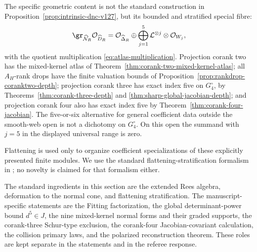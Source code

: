 The specific geometric content is not the standard construction in
Proposition~\ref{prop:intrinsic-dnc-v127}, but its bounded and
stratified special fibre:
\[
 \gr_{\widehat{\mathcal N}_R}\mathcal O_{\widehat D_R}
 =
 \mathcal O_{\widehat\Delta_R}
 \oplus
 \bigoplus_{j=1}^{5}
 \mathcal L^{\otimes j}\otimes\mathcal O_{W_j},
\]
with the quotient multiplication
\eqref{eq:atlas-multiplication}.  Projection corank two has the
mixed-kernel atlas of
Theorem~\ref{thm:corank-two-mixed-kernel-atlas}; all \(A_H\)-rank
drops have the finite valuation bounds of
Proposition~\ref{prop:rankdrop-coranktwo-depth}; projection corank
three has exact index five on \(G_4^\circ\), by
Theorems~\ref{thm:corank-three-depth} and
\ref{thm:sharp-global-jacobian-depth}; and projection corank four
also has exact index five by
Theorem~\ref{thm:corank-four-jacobian}.  The five-or-six alternative
for general coefficient data outside the smooth-web open is not a
dichotomy on \(G_4^\circ\).  On this open the summand with
\(j=5\) in the displayed universal range is zero.

Flattening is used only to organize coefficient specializations of
these explicitly presented finite modules.  We use the standard
flattening-stratification formalism in
\cite[Tag 052F]{StacksFlattening}; no novelty is claimed for that
formalism either.

\begin{remark}
The standard ingredients in this section are the extended Rees
algebra, deformation to the normal cone, and flattening
stratification.  The manuscript-specific statements are the Fitting
factorization, the global determinant-power bound \(d^5\in J\), the
nine mixed-kernel normal forms and their graded supports, the
corank-three Schur-type exclusion, the corank-four
Jacobian-covariant calculation, the collision primary laws, and the
polarized reconstruction theorem.  These roles are kept separate in
the statements and in the referee response.
\end{remark}
